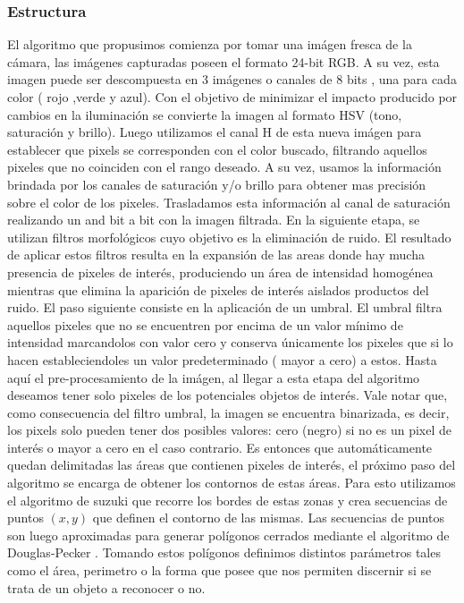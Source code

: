 \subsubsection{Estructura}
El algoritmo que propusimos comienza por tomar una imágen fresca de la cámara, las imágenes capturadas poseen el formato 24-bit RGB. A su vez, esta imagen puede ser descompuesta en 3 imágenes o canales de 8 bits , una para cada color ( rojo ,verde y azul). Con el objetivo de minimizar el impacto producido por cambios en la iluminación se convierte la imagen al formato HSV (tono, saturación y brillo). Luego utilizamos el canal H de esta nueva imágen para establecer que pixels se corresponden con el color buscado, filtrando aquellos pixeles que no coinciden con el rango deseado. A su vez, usamos la información brindada por los  canales de saturación y/o brillo para obtener mas precisión sobre el color de los pixeles.
	\indent Trasladamos esta información al canal de saturación realizando un and bit a bit con la imagen filtrada.  En la siguiente etapa, se utilizan filtros morfológicos cuyo objetivo es la eliminación de ruido. El resultado de aplicar estos filtros resulta en la expansión de las areas donde hay mucha presencia de pixeles de interés, produciendo un área de intensidad homogénea mientras que elimina la aparición de pixeles de interés aislados productos del ruido. El paso siguiente consiste en la aplicación de un umbral. El umbral filtra aquellos pixeles que no se encuentren por encima de un valor mínimo de intensidad marcandolos con valor cero y conserva únicamente los pixeles que si lo hacen estableciendoles un valor predeterminado ( mayor a cero) a estos. 
	\indent Hasta aquí el pre-procesamiento de la imágen, al llegar a esta etapa del algoritmo deseamos tener solo pixeles de los potenciales objetos de interés. Vale notar que, como consecuencia del filtro umbral, la imagen se encuentra binarizada, es decir, los pixels solo pueden tener dos posibles valores: cero (negro) si no es un pixel de interés o mayor a cero en el caso contrario. Es entonces que automáticamente quedan delimitadas las áreas que contienen pixeles de interés, el próximo paso del algoritmo se encarga de obtener los contornos de estas áreas. Para esto utilizamos el algoritmo de suzuki 
\cite{suzuki85} que recorre los bordes de estas zonas y crea secuencias de puntos $(x,y)$ que definen el contorno de las mismas. Las secuencias de puntos son luego aproximadas para generar polígonos cerrados mediante el algoritmo de Douglas-Pecker \cite{dp74}. Tomando estos polígonos definimos distintos parámetros tales como el área, perimetro o la forma que posee que nos permiten discernir si se trata de un objeto a reconocer o no.

